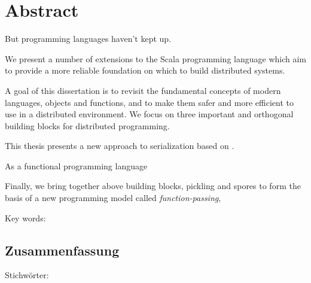 

\cleardoublepage
\chapter*{Abstract}
But programming languages haven't kept up.

We present a number of extensions to the Scala programming language which aim to
provide a more reliable foundation on which to build distributed systems.


A goal of this dissertation is to revisit the fundamental concepts of modern
languages, objects and functions, and to make them safer and more efficient to
use in a distributed environment. We focus on three important and orthogonal
building blocks for distributed programming.

This thesis presents a new approach to serialization based on .

As a functional programming language 



Finally, we bring together above building blocks, pickling and spores to form
the basis of a new programming model called {\em function-passing},

\lipsum[1-2]
\vskip0.5cm
Key words:


\begin{otherlanguage}{german}
\cleardoublepage
\chapter*{Zusammenfassung}
\lipsum[1-2]
\vskip0.5cm
Stichwörter:
\end{otherlanguage}



